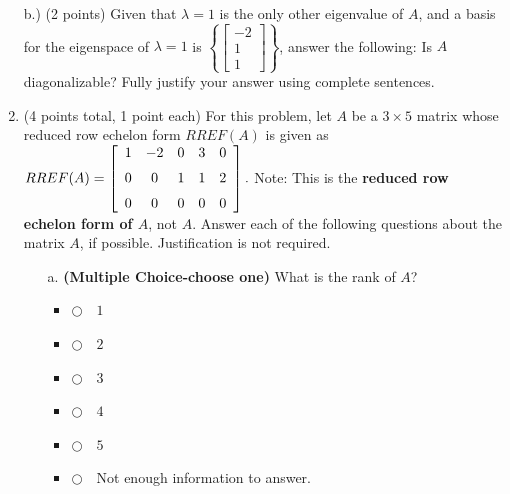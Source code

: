 \documentclass[12pt]{extarticle}
\newcommand{\chooseone}{{\Large$\Circle$\ \ }}
\begin{document}
\begin{enumerate}

\vfill

b.) (2 points) Given that $\lambda=1$ is the only other eigenvalue of $A$, and a basis for the eigenspace of $\lambda=1$ is $\left\{\begin{bmatrix} -2 \\ 1 \\ 1\end{bmatrix}\right\}$, answer the following: Is $A$ diagonalizable? Fully justify your answer using complete sentences.


\vspace{2in}

  
        
\newpage



        
\item (4 points total, 1 point each) For this problem, let $A$ be a $3\times 5$ matrix whose reduced row echelon form $RREF(A)$ is given as 
$RREF(A)= \left[ \begin {array}{ccccc} 1&-2&0&3& 0\\ \noalign{\medskip}0&0&1&1& 2
\\ \noalign{\medskip}0&0&0&0& 0\end {array} \right].$ Note: This is the \textbf{reduced row echelon form of $A$}, not $A$. Answer each of the following questions about the matrix $A$, if possible. Justification is not required.

 \begin{itemize}
   \item[a.]  \textbf{(Multiple Choice-choose one)} What is the rank of $A$?
\begin{itemize}[label={}]
\item \chooseone $1$
\item \chooseone $2$
\item \chooseone $3$
\item \chooseone $4$
\item \chooseone $5$
\item \chooseone Not enough information to answer.
\end{itemize}    



\end{itemize}
\end{enumerate}
\end{document}
